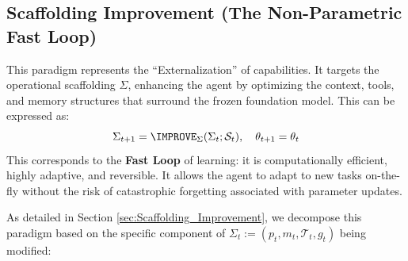 \subsection{Scaffolding Improvement (The Non-Parametric Fast Loop)}
\label{subsec:Scaffolding_Improvement_(The_Non_Parametric_Fast_Loop)}

This paradigm represents the ``Externalization'' of capabilities. It targets the operational scaffolding $\Sigma$, enhancing the agent by optimizing the context, tools, and memory structures that surround the frozen foundation model. This can be expressed as:
\begin{equation}
    \Sigma_{t+1} = \IMPROVE_{\Sigma}(\Sigma_{t}; \mathcal{S}_{t}), \quad \theta_{t+1} = \theta_{t}
\end{equation}
This corresponds to the \textbf{Fast Loop} of learning: it is computationally efficient, highly adaptive, and reversible. It allows the agent to adapt to new tasks on-the-fly without the risk of catastrophic forgetting associated with parameter updates.

As detailed in Section \ref{sec:Scaffolding_Improvement}, we decompose this paradigm based on the specific component of $\Sigma_{t} := (p_{t}, m_{t}, \mathcal{T}_{t}, g_{t})$ being modified:

